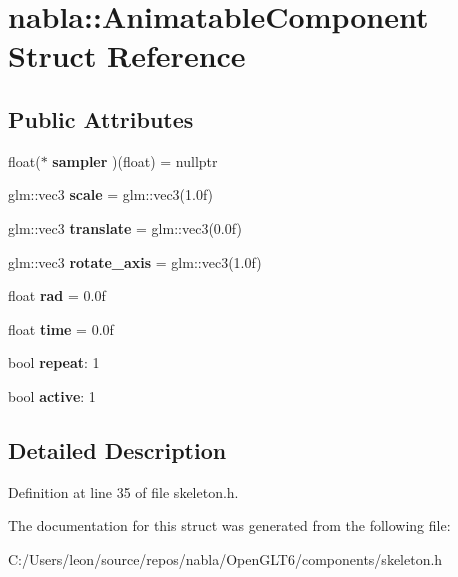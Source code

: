\hypertarget{structnabla_1_1_animatable_component}{}\section{nabla\+::Animatable\+Component Struct Reference}
\label{structnabla_1_1_animatable_component}
\subsection*{Public Attributes}
\begin{DoxyCompactItemize}
\item 
\mbox{\label{structnabla_1_1_animatable_component_a13230be4373b0f1c5d4ca0b0492d0f7b}} 
float($\ast$ {\bfseries sampler} )(float) = nullptr
\item 
\mbox{\label{structnabla_1_1_animatable_component_aded50d1304dc41f747060a3d9e1f5ab3}} 
glm\+::vec3 {\bfseries scale} = glm\+::vec3(1.\+0f)
\item 
\mbox{\label{structnabla_1_1_animatable_component_a069eeab904f683ec21994bcaa868496f}} 
glm\+::vec3 {\bfseries translate} = glm\+::vec3(0.\+0f)
\item 
\mbox{\label{structnabla_1_1_animatable_component_a2a9954591e255f1975cd32c54442c6d9}} 
glm\+::vec3 {\bfseries rotate\+\_\+axis} = glm\+::vec3(1.\+0f)
\item 
\mbox{\label{structnabla_1_1_animatable_component_a9c1c954738c8e824b067abcc65032fc8}} 
float {\bfseries rad} = 0.\+0f
\item 
\mbox{\label{structnabla_1_1_animatable_component_aef3135043d1fa17db5fd838cea54a649}} 
float {\bfseries time} = 0.\+0f
\item 
\mbox{\label{structnabla_1_1_animatable_component_ad0923e9639c0f968ce154c7b53f15f66}} 
bool {\bfseries repeat}\+: 1
\item 
\mbox{\label{structnabla_1_1_animatable_component_a32a2d524f5fd71fbd633fa1d6daab976}} 
bool {\bfseries active}\+: 1
\end{DoxyCompactItemize}


\subsection{Detailed Description}


Definition at line 35 of file skeleton.\+h.



The documentation for this struct was generated from the following file\+:\begin{DoxyCompactItemize}
\item 
C\+:/\+Users/leon/source/repos/nabla/\+Open\+G\+L\+T6/components/skeleton.\+h\end{DoxyCompactItemize}
